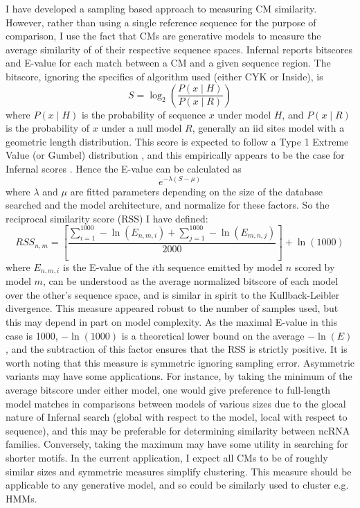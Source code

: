 I have developed a sampling based approach to measuring CM similarity. However, rather than using a single reference sequence for the purpose of comparison, I use the fact that CMs are generative models to measure the average similarity of of their respective sequence spaces. Infernal reports bitscores and E-value for each match between a CM and a given sequence region. The bitscore, ignoring the specifics of algorithm used (either CYK or Inside), is \[S = \log_2\left({\frac{P(x \mid H)}{P(x \mid R)}}\right)\] where $P(x \mid H)$ is the probability of sequence $x$ under model $H$, and $P(x \mid R)$ is the probability of $x$ under a null model $R$, generally an iid sites model with a geometric length distribution. This score is expected to follow a Type 1 Extreme Value (or Gumbel) distribution \parencite{Karlin1990, Eddy2008}, and this empirically appears to be the case for Infernal scores \parencite{Nawrocki2007}. Hence the E-value can be calculated as \[e^{-\lambda(S - \mu)}\] where $\lambda$ and $\mu$ are fitted parameters depending on the size of the database searched and the model architecture, and normalize for these factors. So the reciprocal similarity score (RSS) I have defined: \[ RSS_{n,m} = \left[\frac{\sum_{i=1}^{1000} -\ln{(E_{n,m,i})} +  \sum_{j=1}^{1000} -\ln{(E_{m,n,j})}}{2000}\right] + \ln(1000) \] where $E_{n,m,i}$ is the E-value of the $i$th sequence emitted by model $n$ scored by model $m$, can be understood as the average normalized bitscore of each model over the other's sequence space, and is similar in spirit to the Kullback-Leibler divergence. This measure appeared robust to the number of samples used, but this may depend in part on model complexity. As the maximal E-value in this case is 1000, $-\ln(1000)$ is a theoretical lower bound on the average $-\ln{(E)}$, and the subtraction of this factor ensures that the RSS is strictly positive. It is worth noting that this measure is symmetric ignoring sampling error. Asymmetric variants may have some applications. For instance, by taking the minimum of the average bitscore under either model, one would give preference to full-length model matches in comparisons between models of various sizes due to the glocal nature of Infernal search (global with respect to the model, local with respect to sequence), and this may be preferable for determining similarity between ncRNA families. Conversely, taking the maximum may have some utility in searching for shorter motifs. In the current application, I expect all CMs to be of roughly similar sizes and symmetric measures simplify clustering. This measure should be applicable to any generative model, and so could be similarly used to cluster e.g. HMMs.

